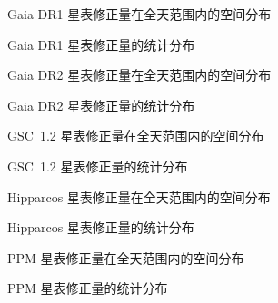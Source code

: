 \documentclass{aastex701}
\begin{document}
\begin{figure}[ht!]
\caption{Gaia DR1 星表修正量在全天范围内的空间分布}
\label{fig:bias_gaiadr1_2x2}
\end{figure}

\begin{figure}[ht!]
\caption{Gaia DR1 星表修正量的统计分布}
\label{fig:hist_gaiadr1}
\end{figure}

\begin{figure}[ht!]
\caption{Gaia DR2 星表修正量在全天范围内的空间分布}
\label{fig:bias_gaiadr2_2x2}
\end{figure}

\begin{figure}[ht!]
\caption{Gaia DR2 星表修正量的统计分布}
\label{fig:hist_gaiadr2}
\end{figure}

\begin{figure}[ht!]
\caption{GSC~1.2 星表修正量在全天范围内的空间分布}
\label{fig:bias_gsc1.2_2x2}
\end{figure}

\begin{figure}[ht!]
\caption{GSC~1.2 星表修正量的统计分布}
\label{fig:hist_gsc1.2}
\end{figure}

\begin{figure}[ht!]
\caption{Hipparcos 星表修正量在全天范围内的空间分布}
\label{fig:bias_hipparcos_2x2}
\end{figure}

\begin{figure}[ht!]
\caption{Hipparcos 星表修正量的统计分布}
\label{fig:hist_hipparcos}
\end{figure}

\begin{figure}[ht!]
\caption{PPM 星表修正量在全天范围内的空间分布}
\label{fig:bias_ppm_2x2}
\end{figure}

\begin{figure}[ht!]
\caption{PPM 星表修正量的统计分布}
\label{fig:hist_ppm}
\end{figure}
\end{document}

